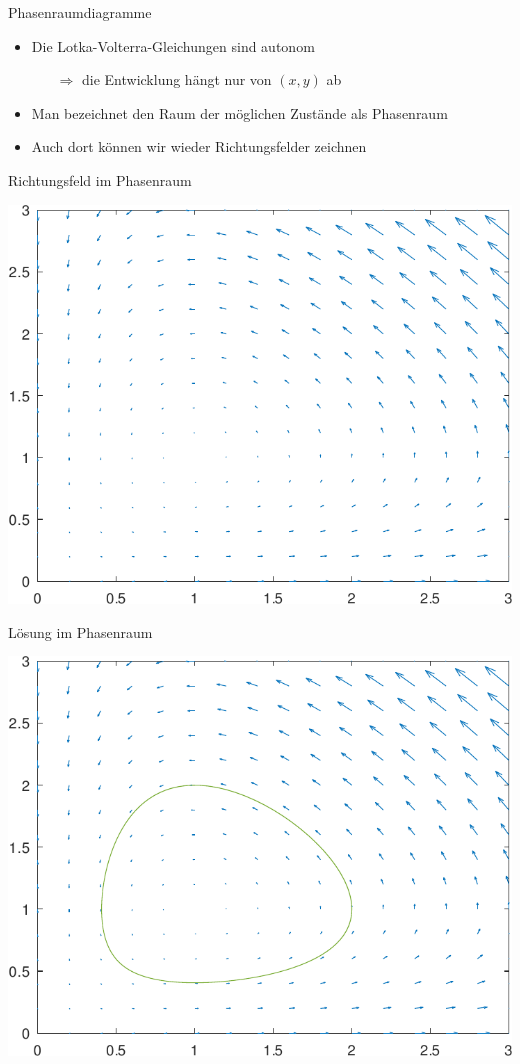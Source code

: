 \documentclass[notheorems,hidelinks,aspectratio=1610]{beamer}
\begin{document}
\begin{frame}{Phasenraumdiagramme}
  \begin{itemize}
  \item Die Lotka-Volterra-Gleichungen sind autonom
    \begin{itemize}
    \item[$\Rightarrow$] die Entwicklung hängt nur von $(x,y)$ ab 
    \end{itemize}
  \item Man bezeichnet den Raum der möglichen Zustände als Phasenraum
  \item Auch dort können wir wieder Richtungsfelder zeichnen
  \end{itemize}
\end{frame}

\begin{frame}{Richtungsfeld im Phasenraum}
  \begin{center}
    \includegraphics[width=.7\textwidth]{octave/volterra-vectors-crop.pdf}
  \end{center}
\end{frame}

\begin{frame}{Lösung im Phasenraum}
  \begin{center}
    \includegraphics[width=.7\textwidth]{octave/volterra-phasespace-crop.pdf}
  \end{center}  
\end{frame}
\end{document}
